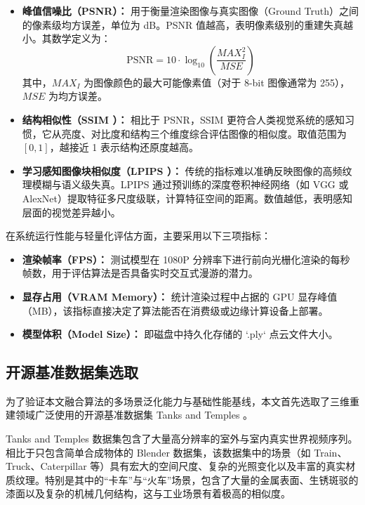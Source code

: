 \begin{itemize}
    \item \textbf{峰值信噪比（PSNR）：} 用于衡量渲染图像与真实图像（Ground Truth）之间的像素级均方误差，单位为 dB。PSNR 值越高，表明像素级别的重建失真越小。其数学定义为：
    \begin{equation}
        \text{PSNR} = 10 \cdot \log_{10} \left( \frac{MAX_I^2}{MSE} \right)
        \label{eq:psnr}
    \end{equation}
    其中，$MAX_I$ 为图像颜色的最大可能像素值（对于 8-bit 图像通常为 255），$MSE$ 为均方误差。
    
    \item \textbf{结构相似性（SSIM \cite{wang2004image}）：} 相比于 PSNR，SSIM 更符合人类视觉系统的感知习惯，它从亮度、对比度和结构三个维度综合评估图像的相似度。取值范围为 $[0,1]$，越接近 1 表示结构还原度越高。
    
    \item \textbf{学习感知图像块相似度（LPIPS \cite{zhang2018unreasonable}）：} 传统的指标难以准确反映图像的高频纹理模糊与语义级失真。LPIPS 通过预训练的深度卷积神经网络（如 VGG 或 AlexNet）提取特征多尺度级联，计算特征空间的距离。数值越低，表明感知层面的视觉差异越小。
\end{itemize}

在系统运行性能与轻量化评估方面，主要采用以下三项指标：
\begin{itemize}
    \item \textbf{渲染帧率（FPS）：} 测试模型在 1080P 分辨率下进行前向光栅化渲染的每秒帧数，用于评估算法是否具备实时交互式漫游的潜力。
    \item \textbf{显存占用（VRAM Memory）：} 统计渲染过程中占据的 GPU 显存峰值（MB），该指标直接决定了算法能否在消费级或边缘计算设备上部署。
    \item \textbf{模型体积（Model Size）：} 即磁盘中持久化存储的 `.ply` 点云文件大小。
\end{itemize}

\subsection{开源基准数据集选取}
\label{subsec:open_source_dataset}

为了验证本文融合算法的多场景泛化能力与基础性能基线，本文首先选取了三维重建领域广泛使用的开源基准数据集 Tanks and Temples \cite{knapitsch2017tanks}。

Tanks and Temples 数据集包含了大量高分辨率的室外与室内真实世界视频序列。相比于只包含简单合成物体的 Blender 数据集，该数据集中的场景（如 Train、Truck、Caterpillar 等）具有宏大的空间尺度、复杂的光照变化以及丰富的真实材质纹理。特别是其中的“卡车”与“火车”场景，包含了大量的金属表面、生锈斑驳的漆面以及复杂的机械几何结构，这与工业场景有着极高的相似度。

